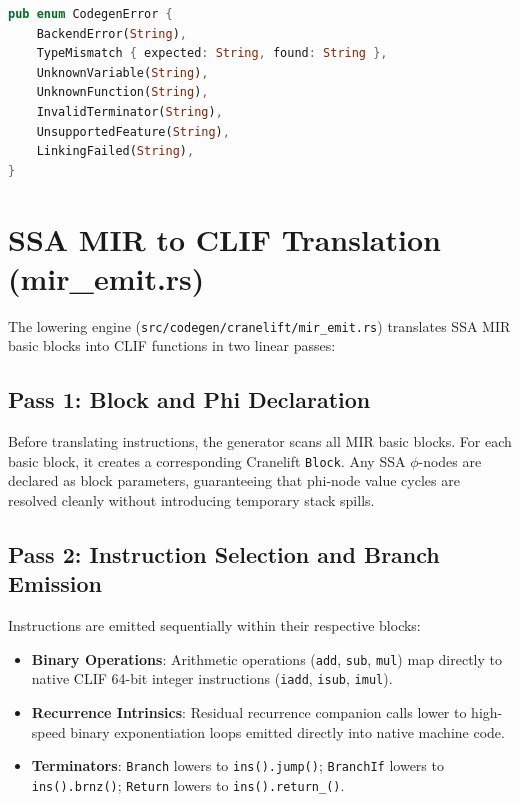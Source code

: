 \begin{lstlisting}[language=Rust, caption={The CodegenError enumeration in NumLang.}]
pub enum CodegenError {
    BackendError(String),
    TypeMismatch { expected: String, found: String },
    UnknownVariable(String),
    UnknownFunction(String),
    InvalidTerminator(String),
    UnsupportedFeature(String),
    LinkingFailed(String),
}
\end{lstlisting}

\section{SSA MIR to CLIF Translation (mir\_emit.rs)}
\label{sec:cranelift:mir_emit}

The lowering engine (\texttt{src/codegen/cranelift/mir\_emit.rs}) translates SSA MIR basic blocks into CLIF functions in two linear passes:

\subsection{Pass 1: Block and Phi Declaration}
Before translating instructions, the generator scans all MIR basic blocks. For each basic block, it creates a corresponding Cranelift \texttt{Block}. Any SSA $\phi$-nodes are declared as block parameters, guaranteeing that phi-node value cycles are resolved cleanly without introducing temporary stack spills.

\subsection{Pass 2: Instruction Selection and Branch Emission}
Instructions are emitted sequentially within their respective blocks:
\begin{itemize}
    \item \textbf{Binary Operations}: Arithmetic operations (\texttt{add}, \texttt{sub}, \texttt{mul}) map directly to native CLIF 64-bit integer instructions (\texttt{iadd}, \texttt{isub}, \texttt{imul}).
    \item \textbf{Recurrence Intrinsics}: Residual recurrence companion calls lower to high-speed binary exponentiation loops emitted directly into native machine code.
    \item \textbf{Terminators}: \texttt{Branch} lowers to \texttt{ins().jump()}; \texttt{BranchIf} lowers to \texttt{ins().brnz()}; \texttt{Return} lowers to \texttt{ins().return\_()}.
\end{itemize}

